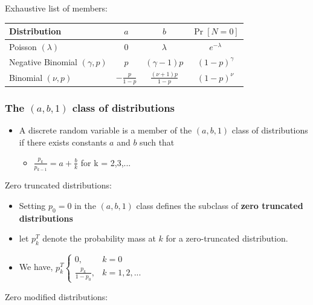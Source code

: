 \documentclass{article}
\begin{document}
Exhaustive list of members:
\begin{table}[ht]
\centering
\begin{tabular}{lccc}
\hline
Distribution & $a$ & $b$ & $\Pr[N=0]$ \\
\hline
Poisson $(\lambda)$ 
  & $0$ 
  & $\lambda$ 
  & $e^{-\lambda}$ \\

Negative Binomial $(\gamma,p)$ 
  & $p$ 
  & $(\gamma-1)p$ 
  & $(1-p)^\gamma$ \\

Binomial $(\nu,p)$ 
  & $-\displaystyle\frac{p}{1-p}$ 
  & $\displaystyle\frac{(\nu+1)p}{1-p}$ 
  & $(1-p)^\nu$ \\
\hline
\end{tabular}
\end{table}


\subsubsection{The $(a,b,1)$ class of distributions}

\begin{itemize}
    \item A discrete random variable is a member of the $(a,b,1)$ class of distributions if there exists constants $a$ and $b$ such that
    \begin{itemize}
        \item $\frac{p_k}{p_{k-1}} = a + \frac{b}{k}$ \hspace{1cm} for k = 2,3,...
    \end{itemize}
\end{itemize}



\noindent Zero truncated distributions:

\begin{itemize}
    \item Setting $p_0 = 0$ in the $(a,b,1)$ class defines the subclass of \textbf{zero truncated distributions}
    \item let $p_k^T$ denote the probability mass at $k$ for a zero-truncated distribution.
    \item We have,    $p_k^T \begin{cases}
        0, & k=0 \\
        \frac{p_k}{1-p_0}, & k = 1,2,...
    \end{cases}$
\end{itemize}

\noindent Zero modified distributions:
\end{document}
